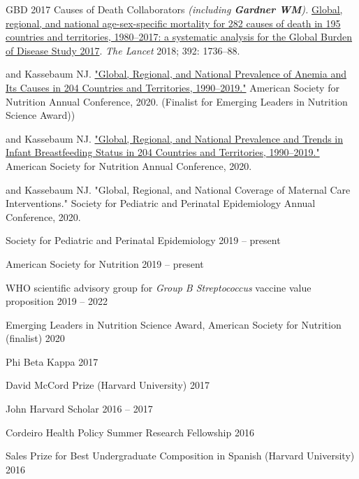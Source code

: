 \documentclass[11pt,article,oneside]{memoir}
\begin{document}
\ind GBD 2017 Causes of Death Collaborators \emph{(including \textbf{Gardner WM}).} \href{https://doi.org/10.1016/S0140-6736(18)32203-7}{Global, regional, and national age-sex-specific
mortality for 282 causes of death in 195 countries and territories, 1980--2017: a systematic analysis for the
Global Burden of Disease Study 2017}. \emph{The Lancet} 2018; 392: 1736--88.

\bigskip

\medskip

 and Kassebaum NJ. \href{https://doi.org/10.1093/cdn/nzaa053_035}{"Global, Regional, and National Prevalence of Anemia and Its
Causes in 204 Countries and Territories, 1990--2019."} American Society for Nutrition Annual Conference, 2020. (Finalist for Emerging 
Leaders in Nutrition Science Award))

 and Kassebaum NJ. \href{https://doi.org/10.1093/cdn/nzaa054_064}{"Global, Regional, and National Prevalence and Trends in Infant Breastfeeding Status in 204 Countries and Territories, 1990--2019."} 
American Society for Nutrition Annual Conference, 2020.

 and Kassebaum NJ. "Global, Regional, and National Coverage of Maternal Care
Interventions." Society for Pediatric and Perinatal Epidemiology Annual Conference, 2020. 

\bigskip

\medskip

\ind Society for Pediatric and Perinatal Epidemiology \hfill 2019 -- present

\ind American Society for Nutrition \hfill 2019 -- present

\ind WHO scientific advisory group for \emph{Group B Streptococcus} vaccine value proposition \hfill 2019 -- 2022

\bigskip

\medskip

\ind Emerging Leaders in Nutrition Science Award, American Society for Nutrition (finalist) \hfill 2020

\ind Phi Beta Kappa \hfill 2017

\ind David McCord Prize (Harvard University) \hfill 2017

\ind John Harvard Scholar \hfill 2016 -- 2017

\ind Cordeiro Health Policy Summer Research Fellowship \hfill 2016

\ind Sales Prize for Best Undergraduate Composition in Spanish (Harvard University) \hfill 2016

\bigskip
\end{document}
